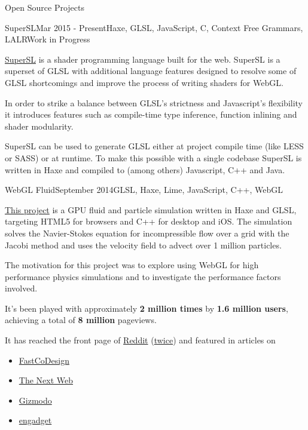 \documentclass{resume} %
\begin{document}
\begin{rSection}{Open Source Projects}

\begin{rSubsection}{SuperSL}{Mar 2015 - Present}{Haxe, GLSL, JavaScript, C, Context Free Grammars, LALR}{Work in Progress}
\item \href{https://github.com/haxiomic/supersl}{SuperSL} is a shader programming language built for the web. SuperSL is a superset of GLSL with additional language features designed to resolve some of GLSL shortcomings and improve the process of writing shaders for WebGL.
\item In order to strike a balance between GLSL's strictness and Javascript's flexibility it introduces features such as compile-time type inference, function inlining and shader modularity.
\item SuperSL can be used to generate GLSL either at project compile time (like LESS or SASS) or at runtime. To make this possible with a single codebase SuperSL is written in Haxe and compiled to (among others) Javascript, C++ and Java.
\end{rSubsection}

\begin{rSubsection}{WebGL Fluid}{September 2014}{GLSL, Haxe, Lime, JavaScript, C++, WebGL}{}
\item \href{https://github.com/haxiomic/GPU-Fluid-Experiments}{This project} is a GPU fluid and particle simulation written in Haxe and GLSL, targeting HTML5 for browsers and C++ for desktop and iOS. The simulation solves the Navier-Stokes equation for incompressible flow over a grid with the Jacobi method and uses the velocity field to advect over 1 million particles.
\item The motivation for this project was to explore using WebGL for high performance physics simulations and to investigate the performance factors involved.
\item It's been played with approximately \textbf{2 million times} by \textbf{1.6 million users}, achieving a total of \textbf{8 million} pageviews.
\item It has reached the front page of \href{https://www.reddit.com/r/InternetIsBeautiful/comments/2gkunq/fluid_and_particles_in_webgl/}{Reddit} (\href{https://www.reddit.com/r/InternetIsBeautiful/comments/35s6hg/in_browser_physics_simulator_xpost_pc_master_race/}{twice}) and featured in articles on
\begin{itemize}
	\item \href{http://www.fastcodesign.com/3038725/this-wonderful-web-toy-turns-your-browser-into-magic-liquid}{FastCoDesign}
	\item \href{http://thenextweb.com/creativity/2015/05/15/webgl-fluid-experiment-is-a-browser-based-lsd-trip/}{The Next Web}
	\item \href{http://www.gizmodo.co.uk/2014/11/just-try-and-stop-playing-with-this-fluid-simulator/}{Gizmodo}
	\item \href{http://www.engadget.com/2015/05/15/GPU-physics-trippy-simulation/}{engadget}
\end{itemize}
\end{rSubsection}
	
\end{rSection}
\end{document}
